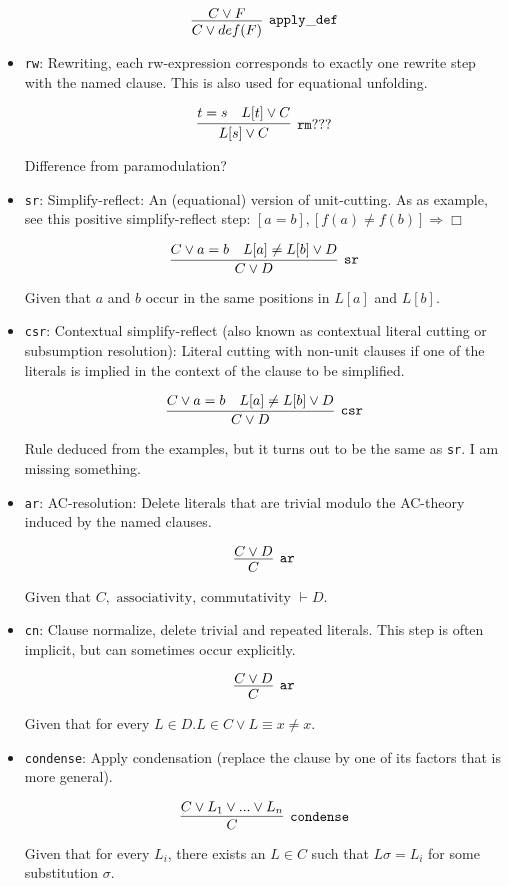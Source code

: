 \documentclass[a4paper, 11pt]{article}
\begin{document}
\begin{itemize}
  \[
  \infer[\mathtt{apply\_def}]{C \vee def(F)}{
    C \vee F
  }
  \]

\item \texttt{rw}: 
  Rewriting, each rw-expression corresponds to exactly one
  rewrite step with the named clause. This is also used for equational unfolding.

  \[
  \infer[\mathtt{rm}???]{L[s] \vee C}{
    t = s &
    L[t] \vee C
  }
  \]
  
  {\color{red}Difference from paramodulation?}

\item \texttt{sr}: 
  Simplify-reflect: An (equational) version of unit-cutting. As
  as example, see this positive simplify-reflect step: 
  \newline
  $[a = b], [f(a) \neq f(b)] \Rightarrow \Box $

  \[
  \infer[\mathtt{sr}]{C \vee D}{
    C \vee a = b &
    L[a] \neq L[b] \vee D
  }
  \]
  
  Given that $a$ and $b$ occur in the same positions in $L[a]$ and $L[b]$.

\item \texttt{csr}: 
  Contextual simplify-reflect (also known as contextual
  literal cutting or subsumption resolution): Literal cutting with non-unit
  clauses if one of the literals is implied in the context of the clause to be
  simplified.

  \[
  \infer[\mathtt{csr}]{C \vee D}{
    C \vee a = b &
    L[a] \neq L[b] \vee D
  }
  \]

  {\color{red}Rule deduced from the examples, but it turns out to be the same as
  \texttt{sr}. I am missing something.}

\item \texttt{ar}: 
  AC-resolution: Delete literals that are trivial modulo the
  AC-theory induced by the named clauses.

  \[
  \infer[\mathtt{ar}]{C}{C \vee D}
  \]

  Given that $C, \mbox{ associativity, commutativity } \vdash D$.

\item \texttt{cn}: 
  Clause normalize, delete trivial and repeated literals. This
  step is often implicit, but can sometimes occur explicitly.

  \[
  \infer[\mathtt{ar}]{C}{C \vee D}
  \]

  Given that for every $L \in D. L \in C \vee L \equiv x \neq x$.

\item \texttt{condense}:
  Apply condensation (replace the clause by one of its factors that is more
  general).

  \[
  \infer[\mathtt{condense}]{C}{C \vee L_1 \vee ... \vee L_n}
  \]

  Given that for every $L_i$, there exists an $L \in C$ such that $L\sigma =
  L_i$ for some substitution $\sigma$.

\end{itemize}
\end{document}
